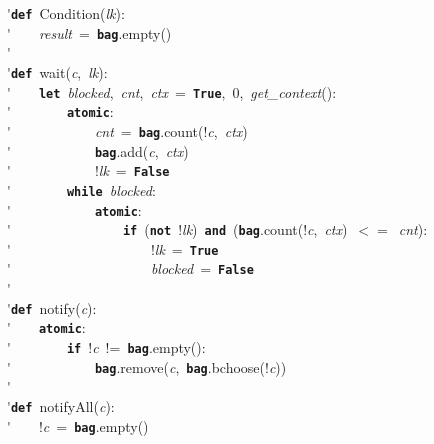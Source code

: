 \'\>\texttt{\textbf{def}}~Condition(\textit{lk}):\\

\'\>~~~~\textit{result}~=~\texttt{\textbf{bag}}.empty()\\

\'\>\\

\'\>\texttt{\textbf{def}}~wait(\textit{c},~\textit{lk}):\\

\'\>~~~~\texttt{\textbf{let}}~\textit{blocked},~\textit{cnt},~\textit{ctx}~=~\texttt{\textbf{True}},~0,~\textit{get\_context}():\\

\'\>~~~~~~~~\texttt{\textbf{atomic}}:\\

\'\>~~~~~~~~~~~~\textit{cnt}~=~\texttt{\textbf{bag}}.count(!\textit{c},~\textit{ctx})\\

\'\>~~~~~~~~~~~~\texttt{\textbf{bag}}.add(\textit{c},~\textit{ctx})\\

\'\>~~~~~~~~~~~~!\textit{lk}~=~\texttt{\textbf{False}}\\

\'\>~~~~~~~~\texttt{\textbf{while}}~\textit{blocked}:\\

\'\>~~~~~~~~~~~~\texttt{\textbf{atomic}}:\\

\'\>~~~~~~~~~~~~~~~~\texttt{\textbf{if}}~(\texttt{\textbf{not}}~!\textit{lk})~\texttt{\textbf{and}}~(\texttt{\textbf{bag}}.count(!\textit{c},~\textit{ctx})~$<=$~\textit{cnt}):\\

\'\>~~~~~~~~~~~~~~~~~~~~!\textit{lk}~=~\texttt{\textbf{True}}\\

\'\>~~~~~~~~~~~~~~~~~~~~\textit{blocked}~=~\texttt{\textbf{False}}\\

\'\>\\

\'\>\texttt{\textbf{def}}~notify(\textit{c}):\\

\'\>~~~~\texttt{\textbf{atomic}}:\\

\'\>~~~~~~~~\texttt{\textbf{if}}~!\textit{c}~!=~\texttt{\textbf{bag}}.empty():\\

\'\>~~~~~~~~~~~~\texttt{\textbf{bag}}.remove(\textit{c},~\texttt{\textbf{bag}}.bchoose(!\textit{c}))\\

\'\>~~~~~~~~\\

\'\>\texttt{\textbf{def}}~notifyAll(\textit{c}):\\

\'\>~~~~!\textit{c}~=~\texttt{\textbf{bag}}.empty()